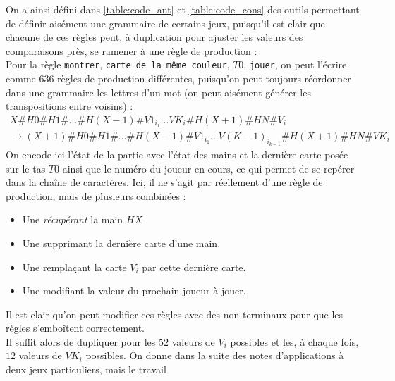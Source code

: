 \documentclass{cours}
\begin{document}
On a ainsi défini dans \ref{table:code_ant} et \ref{table:code_cons} des outils permettant de définir aisément une grammaire de certains jeux, puisqu'il est clair que chacune de ces règles peut, à duplication pour ajuster les valeurs des comparaisons près, se ramener à une règle de production :\\
Pour la règle \og \texttt{montrer}, \texttt{carte de la même couleur}, $T0$, \texttt{jouer}\fg, on peut l'écrire comme $636$ règles de production différentes, puisqu'on peut toujours réordonner dans une grammaire les lettres d'un mot (on peut aisément générer les transpositions entre voisins) : 
\begin{multline}
X\#H0\#H1\#\ldots\#H(X-1)\#V1_{i_{1}}\ldots VK_{i}\#H(X+1)\#HN\#V_{i}\\ \longrightarrow (X + 1)\#H0\#H1\#\ldots\#H(X-1)\#V1_{i_{1}}\ldots V(K-1)_{i_{k-1}}\#H(X+1)\#HN\#VK_{i}
\end{multline}
On encode ici l'état de la partie avec l'état des mains et la dernière carte posée sur le tas $T0$ ainsi que le numéro du joueur en cours, ce qui permet de se repérer dans la chaîne de caractères. Ici, il ne s'agit par réellement d'une règle de production, mais de plusieurs combinées : 
\begin{itemize}
    \item Une {\it récupérant} la main $HX$
    \item Une supprimant la dernière carte d'une main.
    \item Une remplaçant la carte $V_{i}$ par cette dernière carte.
    \item Une modifiant la valeur du prochain joueur à jouer.
\end{itemize}
Il est clair qu'on peut modifier ces règles avec des non-terminaux pour que les règles s'emboîtent correctement. \\
Il suffit alors de dupliquer pour les $52$ valeurs de $V_{i}$ possibles et les, à chaque fois, $12$ valeurs de $VK_{i}$ possibles.
On donne dans la suite des notes d'applications à deux jeux particuliers, mais le travail 
        
\end{document}
